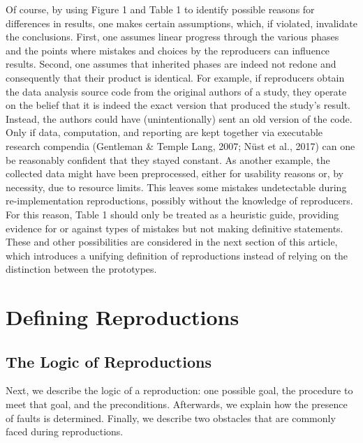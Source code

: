 \documentclass[authordate, meta]{jote-new-article}
\begin{document}
	Of course, by using Figure 1 and Table 1 to identify possible reasons for differences in results, one makes certain assumptions, which, if violated, invalidate the conclusions. First, one assumes linear progress through the various phases and the points where mistakes and choices by the reproducers can influence results. Second, one assumes that inherited phases are indeed not redone and consequently that their product is identical. For example, if reproducers obtain the data analysis source code from the original authors of a study, they operate on the belief that it is indeed the exact version that produced the study's result. Instead, the authors could have (unintentionally) sent an old version of the code. Only if data, computation, and reporting are kept together via executable research compendia (Gentleman \& Temple Lang, 2007; Nüst et al., 2017) can one be reasonably confident that they stayed constant. As another example, the collected data might have been preprocessed, either for usability reasons or, by necessity, due to resource limits. This leaves some mistakes undetectable during re-implementation reproductions, possibly without the knowledge of reproducers. For this reason, Table 1 should only be treated as a heuristic guide, providing evidence for or against types of mistakes but not making definitive statements. These and other possibilities are considered in the next section of this article, which introduces a unifying definition of reproductions instead of relying on the distinction between the prototypes.

	\section{Defining Reproductions}




	\subsection{The Logic of Reproductions}



	Next, we describe the logic of a reproduction: one possible goal, the procedure to meet that goal, and the preconditions. Afterwards, we explain how the presence of faults is determined. Finally, we describe two obstacles that are commonly faced during reproductions.
\end{document}
